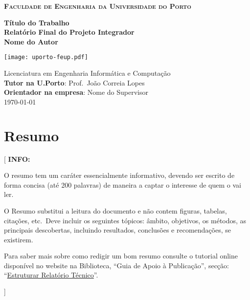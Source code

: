 \documentclass[11pt,a4paper]{report}
\newcommand{\school}{Faculdade de Engenharia da Universidade do Porto}
\newcommand{\degree}{Licenciatura em Engenharia Informática e Computação}
\newcommand{\projtitle}{Título do Trabalho}
\newcommand{\subtitle}{Relatório Final do Projeto Integrador}
\newcommand{\projauthor}{Nome do Autor}
\newcommand{\supervisor}{Nome do Supervisor}
\newcommand{\tutor}{Prof.\ João Correia Lopes}
\newenvironment{info}[1]{\vspace*{6mm}\color{blue}[ \textbf{INFO:} \begin{em} #1}
                        {\vspace*{3mm}\end{em} ]}
\begin{document}
\setcounter{page}{1}
\pagestyle{plain}


\begin{titlepage}
\center

\vspace{-15mm}
{\large \textbf{\textsc{\school}}}\\

\vfill

{\Large \textbf{\projtitle}}\\[8mm]
{\large \textbf{\subtitle}}\\[28mm]

{\Large \textbf{\projauthor}}\\

\vfill

\texttt{[image: uporto-feup.pdf]}

\vfill

{\large \degree}\\[8mm]
{\large \textbf{Tutor na U.Porto}: \tutor}\\[2mm]
{\large \textbf{Orientador na empresa}: \supervisor}\\[8mm]

\today

\end{titlepage}


\chapter*{Resumo}

\begin{info}
O resumo tem um caráter essencialmente informativo, devendo ser
escrito de forma concisa (até 200 palavras) de maneira a captar o
interesse de quem o vai ler.

O Resumo substitui a leitura do documento e não contem figuras,
tabelas, citações, etc.\ 
Deve incluir os seguintes tópicos: âmbito, objetivos, os métodos, as
principais descobertas, incluindo resultados, conclusões e
recomendações, se existirem.

Para saber mais sobre como redigir um bom resumo consulte o tutorial
online disponível no website na Biblioteca, ``Guia de Apoio à
Publicação'', secção: 
``\href{https://docs.google.com/document/d/1TDC1behVq8x7fQL4CcPEEh_np5GXviJevQxnQ9gbiJs/edit\#heading=h.s4z9k57ywd9w}
{Estruturar Relatório Técnico}''.
\end{info}
\end{document}
